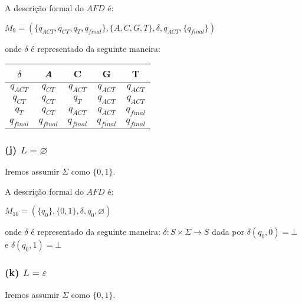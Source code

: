 \documentclass{article}
\begin{document}
\pagebreak

A descrição formal do $AFD$ é:
\begin{center}
  $M_9 = (\{q_{ACT},q_{CT},q_{T},q_{final}\}, \{A,C,G,T\},\delta,q_{ACT}, \{q_{final}\})$
\end{center}
onde $\delta$ é representado da seguinte maneira:

\begin{table}[htbp]
  \centering
  \begin{tabular}{c|cccc}
    \textit{$\delta$} & \textit{A}  & C           & G           & T           \\ \hline
    $q_{ACT}$         & $q_{CT}$    & $q_{ACT}$   & $q_{ACT}$   & $q_{ACT}$   \\
    $q_{CT}$          & $q_{CT}$    & $q_{T}$     & $q_{ACT}$   & $q_{ACT}$   \\
    $q_{T}$           & $q_{CT}$    & $q_{ACT}$   & $q_{ACT}$   & $q_{final}$ \\
    $q_{final}$       & $q_{final}$ & $q_{final}$ & $q_{final}$ & $q_{final}$
  \end{tabular}
\end{table}

\subsubsection*{(j) $L = \varnothing $}
Iremos assumir $\Sigma$ como $\{0,1\}$.

\begin{center}
\end{center}

A descrição formal do $AFD$ é:
\begin{center}
  $M_{10} = (\{q_{0}\}, \{0,1\},\delta,q_{0}, \varnothing)$
\end{center}
onde $\delta$ é representado da seguinte maneira: $\delta:S\times \Sigma\to S$ dada por $\delta(q_0,0)=\bot$ e $\delta(q_0,1)=\bot$

\subsubsection*{(k) $L = {\varepsilon}$ }

Iremos assumir $\Sigma$ como $\{0,1\}$.

\begin{center}
\end{center}
\end{document}
